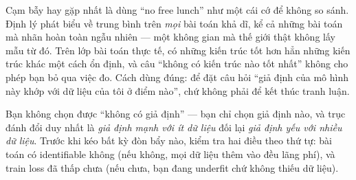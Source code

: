 \documentclass[../../deep_learning.tex]{subfiles}
\begin{document}
\begin{cambay}
Cạm bẫy hay gặp nhất là dùng ``no free lunch'' như một cái cớ để không so sánh. Định lý phát biểu về trung bình trên \emph{mọi} bài toán khả dĩ, kể cả những bài toán mà nhãn hoàn toàn ngẫu nhiên --- một không gian mà thế giới thật không lấy mẫu từ đó. Trên lớp bài toán thực tế, có những kiến trúc tốt hơn hẳn những kiến trúc khác một cách ổn định, và câu ``không có kiến trúc nào tốt nhất'' không cho phép bạn bỏ qua việc đo. Cách dùng đúng: để đặt câu hỏi ``giả định của mô hình này khớp với dữ liệu của tôi ở điểm nào'', chứ không phải để kết thúc tranh luận.
\end{cambay}

\begin{cannho}
Bạn không chọn được ``không có giả định'' --- bạn chỉ chọn giả định nào, và trục đánh đổi duy nhất là \emph{giả định mạnh với ít dữ liệu} đối lại \emph{giả định yếu với nhiều dữ liệu}. Trước khi kéo bất kỳ đòn bẩy nào, kiểm tra hai điều theo thứ tự: bài toán có identifiable không (nếu không, mọi dữ liệu thêm vào đều lãng phí), và train loss đã thấp chưa (nếu chưa, bạn đang underfit chứ không thiếu dữ liệu). 
\end{cannho}
\end{document}

